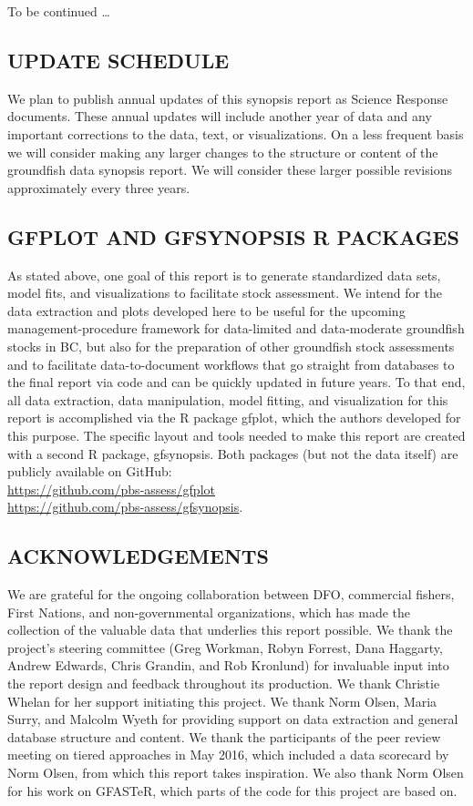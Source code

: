 \documentclass[11pt]{book}\usepackage[]{graphicx}\usepackage[]{color}
\begin{document}
To be continued \ldots

\subsection{UPDATE SCHEDULE}

We plan to publish annual updates of this synopsis report as Science Response
documents. These annual updates will include another year of data and any
important corrections to the data, text, or visualizations. On a less frequent
basis we will consider making any larger changes to the structure or content of
the groundfish data synopsis report. We will consider these larger possible
revisions approximately every three years.

\subsection{GFPLOT AND GFSYNOPSIS R PACKAGES}

As stated above, one goal of this report is to generate standardized data sets,
model fits, and visualizations to facilitate stock assessment. We intend for the
data extraction and plots developed here to be useful for the upcoming
management-procedure framework for data-limited and data-moderate groundfish
stocks in BC, but also for the preparation of other groundfish stock assessments
and to facilitate data-to-document workflows that go straight from databases to
the final report via code and can be quickly updated in future years. To that
end, all data extraction, data manipulation, model fitting, and visualization
for this report is accomplished via the R package gfplot, which the authors
developed for this purpose. The specific layout and tools needed to make this
report are created with a second R package, gfsynopsis. Both packages (but not
the data itself) are publicly available on GitHub:\\
\url{https://github.com/pbs-assess/gfplot}\\
\url{https://github.com/pbs-assess/gfsynopsis}.

\subsection{ACKNOWLEDGEMENTS}

We are grateful for the ongoing collaboration between DFO, commercial fishers,
First Nations, and non-governmental organizations, which has made the collection
of the valuable data that underlies this report possible. We thank the project's
steering committee (Greg Workman, Robyn Forrest, Dana Haggarty, Andrew Edwards,
Chris Grandin, and Rob Kronlund) for invaluable input into the report design and
feedback throughout its production. We thank Christie Whelan for her support
initiating this project. We thank Norm Olsen, Maria Surry, and Malcolm Wyeth for
providing support on data extraction and general database structure and content.
We thank the participants of the peer review meeting on tiered approaches in May
2016, which included a data scorecard by Norm Olsen, from which this report
takes inspiration. We also thank Norm Olsen for his work on GFASTeR, which parts
of the code for this project are based on.
\end{document}
